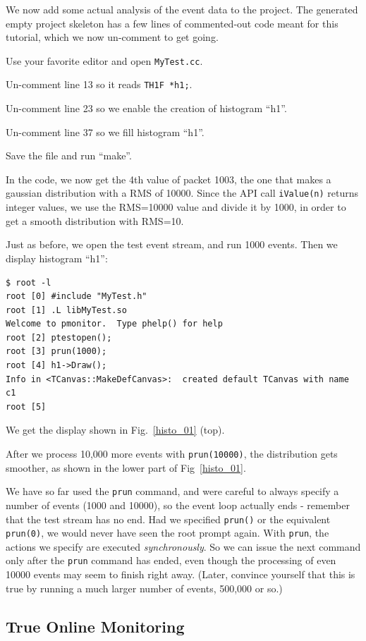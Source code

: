 \documentclass{article}[11pt]
\begin{document}
We now add some actual analysis of the event data to the project. The
generated empty project skeleton has a few lines of commented-out code
meant for this tutorial, which we now un-comment to get going.

Use your favorite editor and open \verb|MyTest.cc|.

Un-comment line 13 so it reads \verb|TH1F *h1;|.

Un-comment line 23 so we enable the creation of histogram ``h1''.

Un-comment line 37 so we fill histogram ``h1''.

Save the file and run ``make''.

In the code, we now get the 4th value of packet 1003, the one that
makes a gaussian distribution with a RMS of 10000. Since the API call
\verb|iValue(n)| returns integer values, we use the RMS=10000 value
and divide it by 1000, in order to get a smooth distribution with RMS=10. 

Just as before, we open the test event stream, and run 1000 events. Then we display
histogram ``h1'':

\begin{verbatim}
$ root -l
root [0] #include "MyTest.h"
root [1] .L libMyTest.so
Welcome to pmonitor.  Type phelp() for help
root [2] ptestopen();
root [3] prun(1000);
root [4] h1->Draw();
Info in <TCanvas::MakeDefCanvas>:  created default TCanvas with name c1
root [5]
\end{verbatim}

We get the display shown in Fig.~\ref{histo_01} (top).


After we process 10,000 more events with \verb|prun(10000)|, the
distribution gets smoother, as shown in the lower part of
Fig~\ref{histo_01}.

We have so far used the \verb|prun| command, and were careful to
always specify a number of events (1000 and 10000), so the event loop
actually ends - remember that the test stream has no end. Had we
specified \verb|prun()| or the equivalent \verb|prun(0)|, we would
never have seen the root prompt again. With \verb|prun|, the actions
we specify are executed \emph{synchronously}. So we can issue the next
command only after the \verb|prun| command has ended, even though the
processing of even 10000 events may seem to finish right away. (Later,
convince yourself that this is true by running a much larger number of
events, 500,000 or so.)

\subsection{True Online Monitoring}
\end{document}
